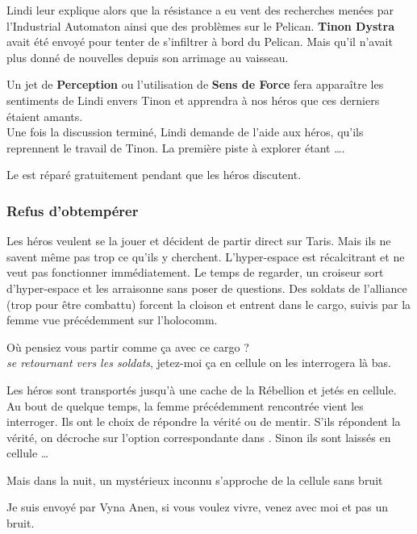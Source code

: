 Lindi leur explique alors que la résistance a eu vent des recherches menées par l’Industrial Automaton ainsi que des problèmes sur le Pelican. \textbf{Tinon Dystra} avait été envoyé pour tenter de s’infiltrer à bord du Pelican. Mais qu’il n’avait plus donné de nouvelles depuis son arrimage au vaisseau.

Un jet de \textbf{Perception} ou l’utilisation de \textbf{Sens de Force} fera apparaître les sentiments de Lindi envers Tinon et apprendra à nos héros que ces derniers étaient amants.\\

Une fois la discussion terminé, Lindi demande de l’aide aux héros, qu’ils reprennent le travail de Tinon. La première piste à explorer étant \ldots {}.

Le  est réparé gratuitement pendant que les héros discutent.


\subsubsection{Refus d’obtempérer} \label{sec:refus-d-obtemperer}

Les héros veulent se la jouer et décident de partir direct sur Taris. Mais ils ne savent même pas trop ce qu’ils y cherchent. L’hyper-espace est récalcitrant et ne veut pas fonctionner immédiatement. Le temps de regarder, un croiseur sort d’hyper-espace et les arraisonne sans poser de questions. Des soldats de l’alliance (trop pour être combattu) forcent la cloison et entrent dans le cargo, suivis par la femme vue précédemment sur l’holocomm.

\begin{quotebox}
    Où pensiez vous partir comme ça avec ce cargo ? \\
    \emph{se retournant vers les soldats}, jetez-moi ça en cellule on les interrogera là bas.
\end{quotebox}

Les héros sont transportés jusqu’à une cache de la Rébellion et jetés en cellule. Au bout de quelque temps, la femme précédemment rencontrée vient les interroger. Ils ont le choix de répondre la vérité ou de mentir. S’ils répondent la vérité, on décroche sur l’option correspondante dans . Sinon ils sont laissés en cellule \ldots

Mais dans la nuit, un mystérieux inconnu s’approche de la cellule sans bruit

\begin{quotebox}
    Je suis envoyé par Vyna Anen, si vous voulez vivre, venez avec moi et pas un bruit.
\end{quotebox}


